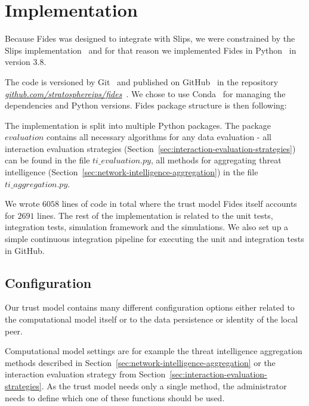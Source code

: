 \section{Implementation}
\label{sec:implementation}
Because Fides was designed to integrate with Slips, we were constrained by the Slips implementation~\cite{slips} and for that reason we implemented Fides in Python~\cite{python} in version 3.8.

The code is versioned by Git~\cite{git} and published on GitHub~\cite{github} in the repository \textit{\href{https://github.com/stratosphereips/fides}{github.com/stratosphereips/fides}}~\cite{fidesGithub}.
We chose to use Conda~\cite{conda} for managing the dependencies and Python versions.
Fides package structure is then following:

\vspace{5mm}
\vspace{5mm}

The implementation is split into multiple Python packages. The package $evaluation$ contains all necessary algorithms for any data evaluation - all interaction evaluation strategies (Section~\ref{sec:interaction-evaluation-strategies}) can be found in the file $ti\_evaluation.py$, all methods for aggregating threat intelligence  (Section~\ref{sec:network-intelligence-aggregation}) in the file $ti\_aggregation.py$.

We wrote $6058$ lines of code in total where the trust model Fides itself accounts for $2691$ lines. The rest of the implementation is related to the unit tests, integration tests, simulation framework and the simulations.
We also set up a simple continuous integration pipeline for executing the unit and integration tests in GitHub.

\subsection{Configuration}
\label{subsec:configuration}
Our trust model contains many different configuration options either related to the computational model itself or to the data persistence or identity of the local peer.

Computational model settings are for example the threat intelligence aggregation methods described in Section~\ref{sec:network-intelligence-aggregation} or the interaction evaluation strategy from Section~\ref{sec:interaction-evaluation-strategies}.
As the trust model needs only a single method, the administrator needs to define which one of these functions should be used.

